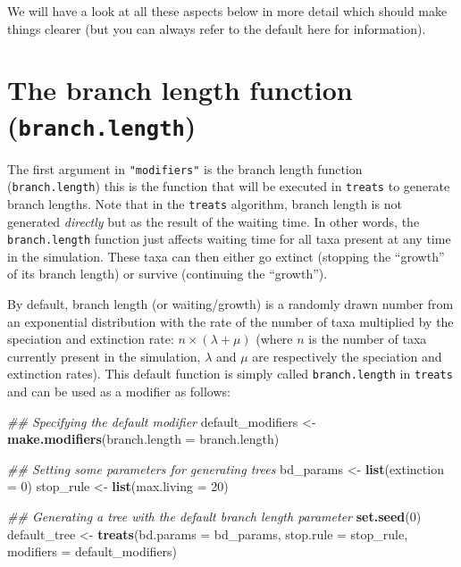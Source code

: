\documentclass[
]{book}
\newenvironment{Shaded}{\begin{snugshade}}{\end{snugshade}}
\newcommand{\CommentTok}[1]{\textcolor[rgb]{0.56,0.35,0.01}{\textit{#1}}}
\newcommand{\DataTypeTok}[1]{\textcolor[rgb]{0.13,0.29,0.53}{#1}}
\newcommand{\DecValTok}[1]{\textcolor[rgb]{0.00,0.00,0.81}{#1}}
\newcommand{\KeywordTok}[1]{\textcolor[rgb]{0.13,0.29,0.53}{\textbf{#1}}}
\newcommand{\NormalTok}[1]{#1}
\newcommand{\StringTok}[1]{\textcolor[rgb]{0.31,0.60,0.02}{#1}}
\begin{document}
We will have a look at all these aspects below in more detail which should make things clearer (but you can always refer to the default here for information).

\hypertarget{the-branch-length-function-branch.length}{%
\section{\texorpdfstring{The branch length function (\texttt{branch.length})}{The branch length function (branch.length)}}\label{the-branch-length-function-branch.length}}

The first argument in \texttt{"modifiers"} is the branch length function (\texttt{branch.length}) this is the function that will be executed in \texttt{treats} to generate branch lengths.
Note that in the \texttt{treats} algorithm, branch length is not generated \emph{directly} but as the result of the waiting time.
In other words, the \texttt{branch.length} function just affects waiting time for all taxa present at any time in the simulation.
These taxa can then either go extinct (stopping the ``growth'' of its branch length) or survive (continuing the ``growth'').

By default, branch length (or waiting/growth) is a randomly drawn number from an exponential distribution with the rate of the number of taxa multiplied by the speciation and extinction rate: \(n \times (\lambda + \mu)\) (where \(n\) is the number of taxa currently present in the simulation, \(\lambda\) and \(\mu\) are respectively the speciation and extinction rates).
This default function is simply called \texttt{branch.length} in \texttt{treats} and can be used as a modifier as follows:

\begin{Shaded}
\begin{Highlighting}[]
\CommentTok{\#\# Specifying the default modifier}
\NormalTok{default\_modifiers \textless{}{-}}\StringTok{ }\KeywordTok{make.modifiers}\NormalTok{(}\DataTypeTok{branch.length =}\NormalTok{ branch.length)}

\CommentTok{\#\# Setting some parameters for generating trees}
\NormalTok{bd\_params \textless{}{-}}\StringTok{ }\KeywordTok{list}\NormalTok{(}\DataTypeTok{extinction =} \DecValTok{0}\NormalTok{)}
\NormalTok{stop\_rule \textless{}{-}}\StringTok{ }\KeywordTok{list}\NormalTok{(}\DataTypeTok{max.living =} \DecValTok{20}\NormalTok{)}

\CommentTok{\#\# Generating a tree with the default branch length parameter}
\KeywordTok{set.seed}\NormalTok{(}\DecValTok{0}\NormalTok{)}
\NormalTok{default\_tree \textless{}{-}}\StringTok{ }\KeywordTok{treats}\NormalTok{(}\DataTypeTok{bd.params =}\NormalTok{ bd\_params,}
                     \DataTypeTok{stop.rule =}\NormalTok{ stop\_rule,}
                     \DataTypeTok{modifiers =}\NormalTok{ default\_modifiers)}
\end{Highlighting}
\end{Shaded}
\end{document}
